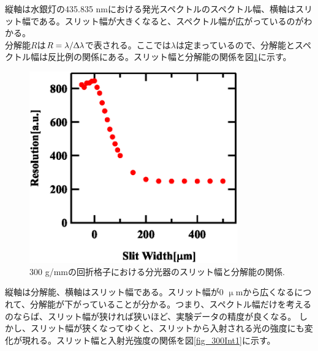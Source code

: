 \documentclass[11pt,a4j]{jsarticle}
\begin{document}
\begin{enumerate}
       縦軸は水銀灯の435.835 nmにおける発光スペクトルのスペクトル幅、横軸はスリット幅である。スリット幅が大きくなると、スペクトル幅が広がっているのがわかる。
       \\
       分解能$R$は$R=\lambda/\Updelta\lambda$で表される。ここでは$\lambda$は定まっているので、分解能とスペクトル幅は反比例の関係にある。スリット幅と分解能の関係を図\ref{fig_300resolution1}に示す。
       \newpage

       \begin{figure}[ht]
        \centering
        \includegraphics[clip,width=9cm]{start1_300Resolution.eps}
        \caption{300 g/mmの回折格子における分光器のスリット幅と分解能の関係.}
        \label{fig_300resolution1}
       \end{figure}

       縦軸は分解能、横軸はスリット幅である。スリット幅が0 $\upmu$mから広くなるにつれて、分解能が下がっていることが分かる。つまり、スペクトル幅だけを考えるのならば、スリット幅が狭ければ狭いほど、実験データの精度が良くなる。
       しかし、スリット幅が狭くなってゆくと、スリットから入射される光の強度にも変化が現れる。スリット幅と入射光強度の関係を図\ref{fig_300Int1}に示す。


\end{enumerate}
\end{document}
